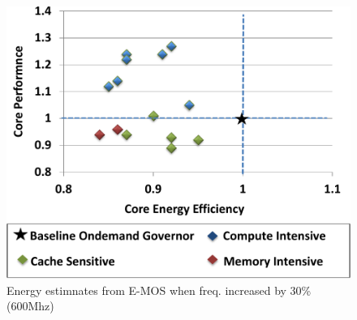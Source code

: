 \begin{figure}[h]
  \begin{center}
\includegraphics[width=\linewidth]{figs/ana-increase-crop.pdf}
  \end{center}
  \vspace{-0.1in}
  \caption{Energy estimnates from E-MOS when freq. increased by 30\% (600Mhz)}
	\label{fig:increase-freq}
\end{figure}

